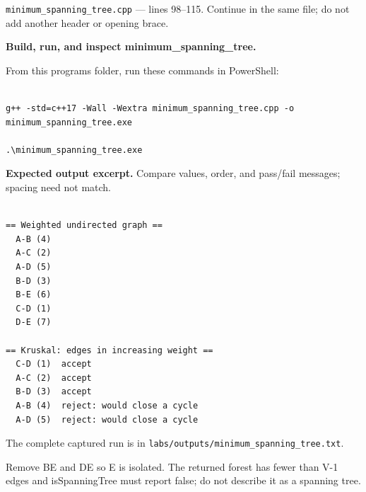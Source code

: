 \texttt{minimum\_spanning\_tree.cpp} --- lines 98--115. Continue in the same file; do not add another header or opening brace.




\tcbbreak

\textbf{Build, run, and inspect minimum\_spanning\_tree.}

From this program\textquotesingle s folder, run these commands in PowerShell:

\begin{lstlisting}[style=utpterminal,language={}]

g++ -std=c++17 -Wall -Wextra minimum_spanning_tree.cpp -o minimum_spanning_tree.exe

.\minimum_spanning_tree.exe

\end{lstlisting}

\textbf{Expected output excerpt.} Compare values, order, and pass/fail messages; spacing need not match.

\begin{lstlisting}[style=utpterminal,language={}]

== Weighted undirected graph ==
  A-B (4)
  A-C (2)
  A-D (5)
  B-D (3)
  B-E (6)
  C-D (1)
  D-E (7)

== Kruskal: edges in increasing weight ==
  C-D (1)  accept
  A-C (2)  accept
  B-D (3)  accept
  A-B (4)  reject: would close a cycle
  A-D (5)  reject: would close a cycle

\end{lstlisting}

The complete captured run is in \texttt{labs/outputs/minimum\_spanning\_tree.txt}.

\begin{tryit}

Remove BE and DE so E is isolated. The returned forest has fewer than V-1 edges and isSpanningTree must report false; do not describe it as a spanning tree.

\end{tryit}
